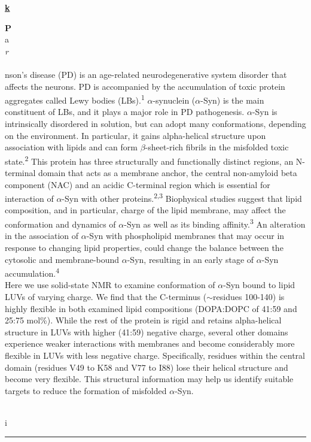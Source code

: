 \documentclass[titlepage,oneside,openany,10pt]{book}
\newenvironment{posterabswref}[5] %
        {
        \newcommand{\posterref}{#5}
	\begin{flushright}
                \underline{\textbf{#4}}
        \end{flushright}
        \textbf{#1}\\%
        #2\\%
        \textit{#3}\\\\%
        }
        {
        \vspace{0.5cm}
        \\\noindent \posterref \\ \noindent\rule{15cm}{0.5pt}%
        }
\begin{document}
\begin{posterabswref}
    Parkinson's disease (PD) is an age-related neurodegenerative system disorder that affects the neurons. PD is accompanied by the accumulation of toxic protein aggregates called Lewy bodies (LBs).\textsuperscript{1} $\alpha$-synuclein ($\alpha$-Syn) is the main constituent of LBs, and it plays a major role in PD pathogenesis. $\alpha$-Syn is intrinsically disordered in solution, but can adopt many conformations, depending on the environment. In particular, it gains alpha-helical structure upon association with lipids and can form $\beta$-sheet-rich fibrils in the misfolded toxic state.\textsuperscript{2} This protein has three structurally and functionally distinct regions, an N-terminal domain that acts as a membrane anchor, the central non-amyloid beta component (NAC) and an acidic C-terminal region which is essential for interaction of $\alpha$-Syn with other proteins.\textsuperscript{2,3} Biophysical studies suggest that lipid composition, and in particular, charge of the lipid membrane, may affect the conformation and dynamics of $\alpha$-Syn as well as its binding affinity.\textsuperscript{3} An alteration in the association of $\alpha$-Syn with phospholipid membranes that may occur in response to changing lipid properties, could change the balance between the cytosolic and membrane-bound $\alpha$-Syn, resulting in an early stage of $\alpha$-Syn accumulation.\textsuperscript{4}\\Here we use solid-state NMR to examine conformation of $\alpha$-Syn bound to lipid LUVs of varying charge. We find that the C-terminus ($\sim$residues 100-140) is highly flexible in both examined lipid compositions (DOPA:DOPC of 41:59 and 25:75 mol\%). While the rest of the protein is rigid and retains alpha-helical structure in LUVs with higher (41:59) negative charge, several other domains experience weaker interactions with membranes and become considerably more flexible in LUVs with less negative charge. Specifically, residues within the central domain (residues V49 to K58 and V77 to I88) lose their helical structure and become very flexible. This structural information may help us identify suitable targets to reduce the formation of misfolded $\alpha$-Syn.
    \label{LavasaniM}
\end{posterabswref}
\end{document}
